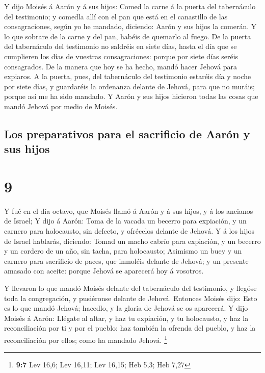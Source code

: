  Y dijo Moisés á Aarón y á sus hijos: Comed la carne á la
puerta del tabernáculo del testimonio; y comedla allí con el pan que
está en el canastillo de las consagraciones, según yo he mandado,
diciendo: Aarón y sus hijos la comerán.  Y lo que sobrare
de la carne y del pan, habéis de quemarlo al fuego.  De la
puerta del tabernáculo del testimonio no saldréis en siete días, hasta
el día que se cumplieren los días de vuestras consagraciones: porque por
siete días seréis consagrados.  De la manera que hoy se ha
hecho, mandó hacer Jehová para expiaros.  A la puerta,
pues, del tabernáculo del testimonio estaréis día y noche por siete
días, y guardaréis la ordenanza delante de Jehová, para que no muráis;
porque así me ha sido mandado.  Y Aarón y sus hijos
hicieron todas las cosas que mandó Jehová por medio de Moisés.

\hypertarget{los-preparativos-para-el-sacrificio-de-aaruxf3n-y-sus-hijos}{%
\subsection{Los preparativos para el sacrificio de Aarón y sus
hijos}\label{los-preparativos-para-el-sacrificio-de-aaruxf3n-y-sus-hijos}}

\hypertarget{section-8}{%
\section{9}\label{section-8}}

 Y fué en el día octavo, que Moisés llamó á Aarón y á sus
hijos, y á los ancianos de Israel;  Y dijo á Aarón: Toma de
la vacada un becerro para expiación, y un carnero para holocausto, sin
defecto, y ofrécelos delante de Jehová.  Y á los hijos de
Israel hablarás, diciendo: Tomad un macho cabrío para expiación, y un
becerro y un cordero de un año, sin tacha, para holocausto; 
Asimismo un buey y un carnero para sacrificio de paces, que inmoléis
delante de Jehová; y un presente amasado con aceite: porque Jehová se
aparecerá hoy á vosotros.

 Y llevaron lo que mandó Moisés delante del tabernáculo del
testimonio, y llegóse toda la congregación, y pusiéronse delante de
Jehová.  Entonces Moisés dijo: Esto es lo que mandó Jehová;
hacedlo, y la gloria de Jehová se os aparecerá.  Y dijo
Moisés á Aarón: Llégate al altar, y haz tu expiación, y tu holocausto, y
haz la reconciliación por ti y por el pueblo: haz también la ofrenda del
pueblo, y haz la reconciliación por ellos; como ha mandado Jehová.
\footnote{\textbf{9:7} Lev 16,6; Lev 16,11; Lev 16,15; Heb 5,3; Heb 7,27}

